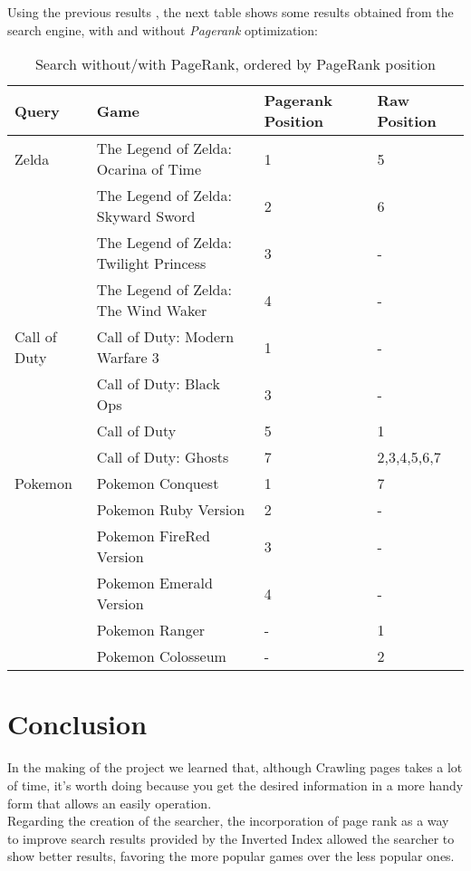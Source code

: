 \documentclass{article}
\begin{document}
Using the previous results , the next table shows some results obtained from the search engine, with and without \textit{Pagerank} optimization:

\begin{table}[h]
    \centering
    \begin{tabular}{|l|l|l|l|}
         \hline
         
         Query&Game&Pagerank Position&Raw Position\\ \hline
         Zelda&The Legend of Zelda: Ocarina of Time&1&5\\
         &The Legend of Zelda: Skyward Sword&2&6\\
         &The Legend of Zelda: Twilight Princess&3&-\\
         &The Legend of Zelda: The Wind Waker&4&-\\
         \hline
         Call of Duty&Call of Duty: Modern Warfare 3&1&-\\
         &Call of Duty: Black Ops&3&-\\
         &Call of Duty&5&1\\
         &Call of Duty: Ghosts&7&2,3,4,5,6,7\\\hline
         Pokemon&Pokemon Conquest&1&7\\
         &Pokemon Ruby Version&2&-\\
         &Pokemon FireRed Version&3&-\\
         &Pokemon Emerald Version&4&-\\
         &Pokemon Ranger&-&1\\
         &Pokemon Colosseum&-&2\\
         \hline
    \end{tabular}
    \caption{Search without/with PageRank, ordered by PageRank position}
    \label{tab:conv_cmp}
\end{table}{}


\newpage

\section{Conclusion}
In the making of the project we learned that, although Crawling pages takes a lot of time, it's worth doing because you get the desired information in a more handy form that allows an easily operation.\\

Regarding the creation of the searcher, the incorporation of page rank as a way to improve search results provided by the Inverted Index allowed the searcher to show better results, favoring the more popular games over the less popular ones.\\ 
\end{document}
